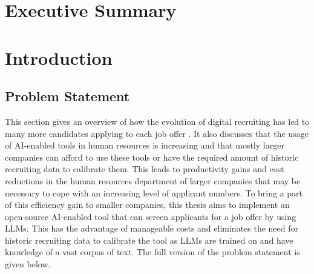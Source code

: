 \documentclass[draft,final]{thesisclass} %
\begin{document}
\chapter{Executive Summary}
\lipsum[1]
\cleardoublepage

\begin{abstract}
\lipsum[1]
\end{abstract}

\mainmatter

\chapter{Introduction} \label{introduction}

\section{Problem Statement} \label{problem_statement}
This section gives an overview of how the evolution of digital recruiting has led to many more candidates applying to each job offer \parencite[4]{ai_recruiting}.
It also discusses that the usage of \acs{AI}-enabled tools in human resources is increasing and that mostly larger companies can afford to use these tools or have the required amount of historic recruiting data to calibrate them.
This leads to productivity gains and cost reductions in the human resources department of larger companies that may be necessary to cope with an increasing level of applicant numbers.
To bring a part of this efficiency gain to smaller companies, this thesis aims to implement an open-source \acs{AI}-enabled tool that can screen applicants for a job offer by using \acs{LLM}s.
This has the advantage of manageable costs and eliminates the need for historic recruiting data to calibrate the tool as \acs{LLM}s are trained on and have knowledge of a vast corpus of text.
The full version of the problem statement is given below.
\end{document}
